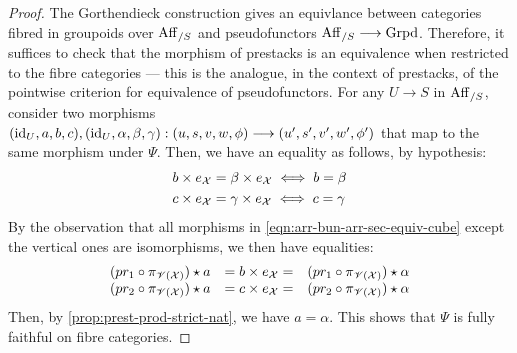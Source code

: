 \documentclass[11pt]{amsart}
\begin{document}
\begin{proof}
The Gorthendieck construction gives an equivlance between categories fibred in
groupoids over $\mathrm{Aff}_{/S}$ and pseudofunctors $\Aff_{/S} \to \Grpd$. Therefore,
it suffices to check that the morphism
of prestacks is an equivalence when restricted to the fibre categories --- this
is the analogue, in the context of prestacks, of the pointwise criterion for
equivalence of pseudofunctors.
For any $U \to S$ in $\mathrm{Aff}_{/S}$, consider two morphisms
$(\id_U, a, b, c), (\id_U, \alpha, \beta, \gamma) : (u, s, v, w, \phi) \to
(u', s', v', w', \phi')$ that map to the same morphism under $\Psi$.
Then, we have an equality as follows, by hypothesis:
\begin{align*}
b \times e_\mathcal{X} &= \beta \times e_\mathcal{X} \iff b = \beta \\
c \times e_\mathcal{X} &= \gamma \times e_\mathcal{X} \iff c = \gamma
\end{align*}
By the observation that all morphisms in \cref{eqn:arr-bun-arr-sec-equiv-cube}
except the vertical ones are isomorphisms, we then have equalities:
\[\begin{array}{ccc}
(pr_1 \circ \pi_{\mathscr{V}(\mathcal{X})}) \star a &= b \times e_\mathcal{X} =& (pr_1 \circ \pi_{\mathscr{V}(\mathcal{X})}) \star \alpha \\
(pr_2 \circ \pi_{\mathscr{V}(\mathcal{X})}) \star a &= c \times e_\mathcal{X} =& (pr_2 \circ \pi_{\mathscr{V}(\mathcal{X})}) \star \alpha
\end{array}\]
Then, by \cref{prop:prest-prod-strict-nat}, we have $a = \alpha$. This shows
that $\Psi$ is fully faithful on fibre categories.


\end{proof}
\end{document}
